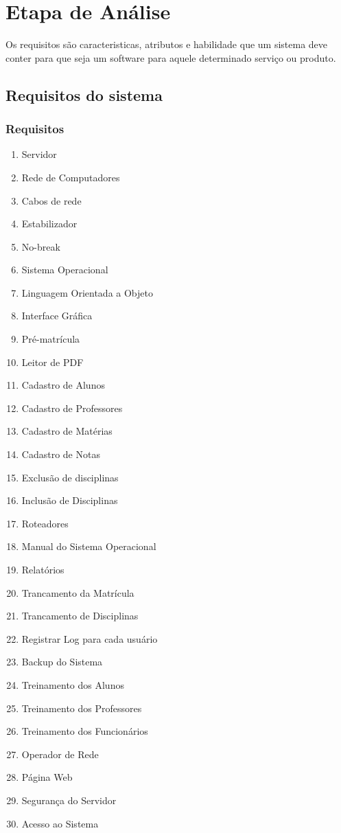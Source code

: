 

\chapter{Etapa de An\'{a}lise}
Os requisitos são caracteristicas, atributos e habilidade que um sistema deve conter para que seja um software
para aquele determinado serviço ou produto.
  \section{Requisitos do sistema}
 \subsection{Requisitos}
  \begin{enumerate}
      \item Servidor
      \item Rede de Computadores
      \item Cabos de rede
      \item Estabilizador
      \item No-break
      \item Sistema Operacional
      \item Linguagem Orientada a Objeto
      \item Interface Gráfica
      \item Pré-matrícula
      \item Leitor de PDF
      \item Cadastro de Alunos
      \item Cadastro de Professores
      \item Cadastro de Matérias
      \item Cadastro de Notas
      \item Exclusão de disciplinas
      \item Inclusão de Disciplinas
      \item Roteadores
      \item Manual do Sistema Operacional
      \item Relatórios
      \item Trancamento da Matrícula
      \item Trancamento de Disciplinas
      \item Registrar Log para cada usuário
      \item Backup do Sistema
      \item Treinamento dos Alunos
      \item Treinamento dos Professores
      \item Treinamento dos Funcionários
      \item Operador de Rede
      \item Página Web
      \item Segurança do Servidor
      \item Acesso ao Sistema
  \end{enumerate}
  
